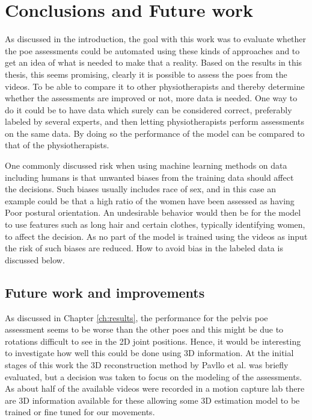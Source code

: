 \chapter{Conclusions and Future work} \label{ch:conclusions}
As discussed in the introduction, the goal with this work was to evaluate whether the \gls{poe} assessments could be automated using these kinds of approaches and to get an idea of what is needed to make that a reality. Based on the results in this thesis, this seems promising, clearly it is possible to assess the \glspl{poe} from the videos. To be able to compare it to other physiotherapists and thereby determine whether the assessments are improved or not, more data is needed. One way to do it could be to have data which surely can be considered correct, preferably labeled by several experts, and then letting physiotherapists perform assessments on the same data. By doing so the performance of the model can be compared to that of the physiotherapists.

One commonly discussed risk when using machine learning methods on data including humans is that unwanted biases from the training data should affect the decisions. Such biases usually includes race of sex, and in this case an example could be that a high ratio of the women have been assessed as having Poor postural orientation. An undesirable behavior would then be for the model to use features such as long hair and certain clothes, typically identifying women, to affect the decision. As no part of the model is trained using the videos as input the risk of such biases are reduced. How to avoid bias in the labeled data is discussed below.


\section{Future work and improvements}
As discussed in Chapter \ref{ch:results}, the performance for the pelvis \gls{poe} assessment seems to be worse than the other \glspl{poe} and this might be due to rotations difficult to see in the 2D joint positions. Hence, it would be interesting to investigate how well this could be done using 3D information. At the initial stages of this work the 3D reconstruction method by Pavllo et al. \cite{Pavllo2019} was briefly evaluated, but a decision was taken to focus on the modeling of the assessments. As about half of the available videos were recorded in a motion capture lab there are 3D information available for these allowing some 3D estimation model to be trained or fine tuned for our movements.

